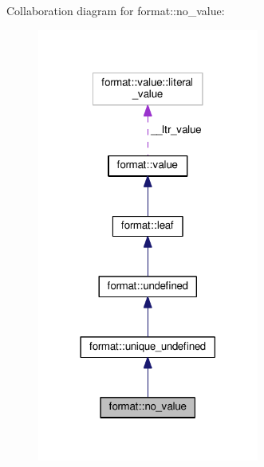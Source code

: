Collaboration diagram for format\+:\+:no\+\_\+value\+:
\nopagebreak
\begin{figure}[H]
\begin{center}
\leavevmode
\includegraphics[width=206pt]{classformat_1_1no__value__coll__graph}
\end{center}
\end{figure}
